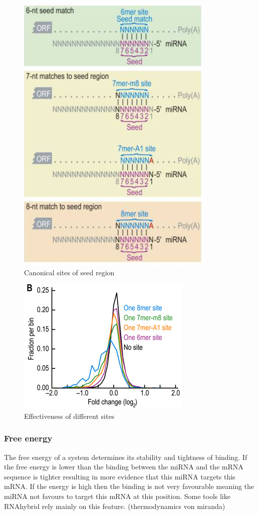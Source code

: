 \documentclass[12pt]{article}
\begin{document}
\begin{figure}
\centering
\includegraphics[scale=0.6]{results/canonical_sites.png}
\caption{Canonical sites of seed region}
\label{Fig:canonical}
\end{figure}


\begin{figure}
\centering
\includegraphics[scale=0.6]{results/site_3addi.png}
\caption{Effectiveness of different sites}
\label{types}
\end{figure}

\subsubsection{Free energy}
The free energy of a system determines its stability and tightness of binding. If the free energy is lower than the binding between the miRNA and the mRNA sequence is tighter resulting in more evidence that this miRNA targets this mRNA. If the energy is high then the binding is not very favourable meaning the miRNA not favours to target this mRNA at this position. Some tools like RNAhybrid \cite{Rehmsmeier} rely mainly on this feature. (thermodynamics von miranda)
 
\end{document}
